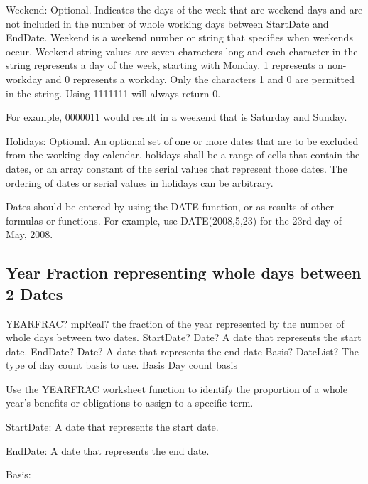 Weekend:  Optional. Indicates the days of the week that are weekend days and are not included in the number of whole working days between StartDate and EndDate. Weekend is a weekend number or string that specifies when weekends occur.
Weekend string values are seven characters long and each character in the string represents a day of the week, starting with Monday. 1 represents a non-workday and 0 represents a workday. Only the characters 1 and 0 are permitted in the string. Using 1111111 will always return 0.

For example, 0000011 would result in a weekend that is Saturday and Sunday.

Holidays:  Optional. An optional set of one or more dates that are to be excluded from the working day calendar. holidays shall be a range of cells that contain the dates, or an array constant of the serial values that represent those dates. The ordering of dates or serial values in holidays can be arbitrary.

Dates should be entered by using the DATE function, or as results of other formulas or functions. For example, use DATE(2008,5,23) for the 23rd day of May, 2008.



\subsection{Year Fraction representing whole days between 2 Dates}

\begin{mpFunctionsExtract}
	\mpWorksheetFunctionThreeNotImplemented
	{YEARFRAC? mpReal? the fraction of the year represented by the number of whole days between two dates.}
	{StartDate? Date? A date that represents the start date.}
	{EndDate? Date? A date that represents the end date}
	{Basis? DateList?  The type of day count basis to use. Basis Day count basis }
\end{mpFunctionsExtract}


\vspace{0.3cm}
Use the YEARFRAC worksheet function to identify the proportion of a whole year's benefits or obligations to assign to a specific term.

\vspace{0.3cm}
StartDate: A date that represents the start date.

EndDate: A date that represents the end date.

\vspace{0.3cm}
Basis:  

